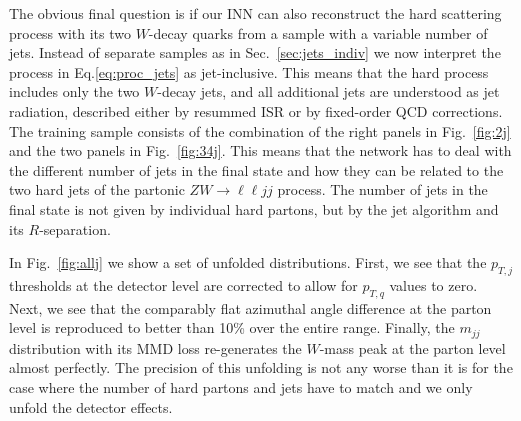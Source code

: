 The obvious final question is if our INN can also reconstruct the hard
scattering process with its two $W$-decay quarks from a sample with a variable number of
jets. Instead of separate samples as in Sec.~\ref{sec:jets_indiv} we
now interpret the process in Eq.\eqref{eq:proc_jets} as
jet-inclusive. This means that the hard process includes only the two
$W$-decay jets, and all additional jets are understood as jet radiation,
described either by resummed ISR or by fixed-order QCD corrections.
The training sample consists of the combination of the right panels in
Fig.~\ref{fig:2j} and the two panels in Fig.~\ref{fig:34j}. This means
that the network has to deal with the different number of jets in the
final state and how they can be related to the two hard jets of the
partonic $ZW \to \ell \ell jj$ process. The number of jets in the
final state is not given by individual hard partons, but by the jet
algorithm and its $R$-separation.

In Fig.~\ref{fig:allj} we show a set of unfolded distributions. First,
we see that the $p_{T,j}$ thresholds at the detector level are
corrected to allow for $p_{T,q}$ values to zero.  Next, we see that
the comparably flat azimuthal angle difference at the parton level is
reproduced to better than 10\% over the entire range. Finally, the
$m_{jj}$ distribution with its MMD loss re-generates the $W$-mass peak
at the parton level almost perfectly. The precision of this unfolding
is not any worse than it is for the case where the number of hard
partons and jets have to match and we only unfold the detector
effects.

